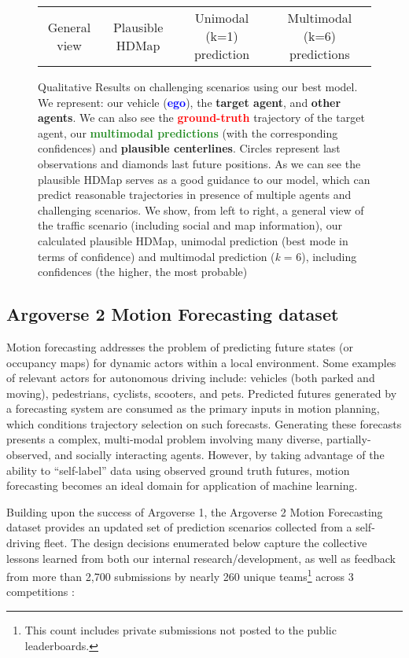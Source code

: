 \begin{figure*}[!ht]
\begin{tabular}{cccc}
		\tabularnewline
		
		General view & Plausible HDMap & Unimodal (k=1) prediction & Multimodal (k=6) predictions \tabularnewline
	\end{tabular}
	\caption{Qualitative Results on challenging scenarios using our best model. %
		We represent: our vehicle (\textbf{\textcolor{blue}{ego}}), the \textbf{\textcolor{YellowOrange}{target agent}}, and \textbf{\textcolor{gray75}{other agents}}. We can also see the \textbf{\textcolor{red}{ground-truth}} trajectory of the target agent, our \textbf{\textcolor{ForestGreen}{multimodal predictions}} (with the corresponding confidences) and \textbf{plausible centerlines}. Circles represent last observations and diamonds last future positions.
		As we can see the plausible HDMap serves as a good guidance to our model, which can predict reasonable trajectories in presence of multiple agents and challenging scenarios. We show, from left to right, a general view of the traffic scenario (including social and map information), our calculated plausible HDMap, unimodal prediction (best mode in terms of confidence) and multimodal prediction (\textit{k} = 6), including confidences (the higher, the most probable)}
	\label{fig:results}
\end{figure*}

\subsection{Argoverse 2 Motion Forecasting dataset}
\label{subsec:5_argoverse_2}

Motion forecasting addresses the problem of predicting future states (or occupancy maps) for dynamic actors within a local environment.  Some examples of relevant actors for autonomous driving include: vehicles (both parked and moving), pedestrians, cyclists, scooters, and pets.  Predicted futures generated by a forecasting system are consumed as the primary inputs in motion planning, which conditions trajectory selection on such forecasts. Generating these forecasts presents a complex, multi-modal problem involving many diverse, partially-observed, and socially interacting agents. However, by taking advantage of the ability to ``self-label'' data using observed ground truth futures, motion forecasting becomes an ideal domain for application of machine learning. 

Building upon the success of Argoverse 1, the Argoverse 2 Motion Forecasting dataset provides an updated set of prediction scenarios collected from a self-driving fleet. The design decisions enumerated below capture the collective lessons learned from both our internal research/development, as well as feedback from more than 2,700 submissions by nearly 260 unique teams\footnote{This count includes private submissions not posted to the public leaderboards.} across 3 competitions \cite{argoverse_forecasting_challenge}:

